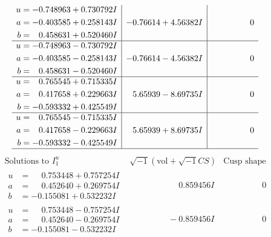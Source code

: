 \documentclass[1p]{elsarticle_modified}
\theoremstyle{definition}
\newcommand{\I}{\sqrt{-1}}
\begin{document}
$$\begin{array}{c|c|c}
\begin{aligned}
u &= -0.748963 + 0.730792 I \\
a &= -0.403585 + 0.258143 I \\
b &= \phantom{-}0.458631 + 0.520460 I\end{aligned}
 & -0.76614 + 4.56382 I & \phantom{-0.000000 } 0 \\ \hline\begin{aligned}
u &= -0.748963 - 0.730792 I \\
a &= -0.403585 - 0.258143 I \\
b &= \phantom{-}0.458631 - 0.520460 I\end{aligned}
 & -0.76614 - 4.56382 I & \phantom{-0.000000 } 0 \\ \hline\begin{aligned}
u &= \phantom{-}0.765545 + 0.715335 I \\
a &= \phantom{-}0.417658 + 0.229663 I \\
b &= -0.593332 + 0.425549 I\end{aligned}
 & \phantom{-}5.65939 - 8.69735 I & \phantom{-0.000000 } 0 \\ \hline\begin{aligned}
u &= \phantom{-}0.765545 - 0.715335 I \\
a &= \phantom{-}0.417658 - 0.229663 I \\
b &= -0.593332 - 0.425549 I\end{aligned}
 & \phantom{-}5.65939 + 8.69735 I & \phantom{-0.000000 } 0\\
 \hline 
 \end{array}$$\newpage$$\begin{array}{c|c|c}  
\text{Solutions to }I^u_{1}& \I (\text{vol} + \sqrt{-1}CS) & \text{Cusp shape}\\
 \hline 
\begin{aligned}
u &= \phantom{-}0.753448 + 0.757254 I \\
a &= \phantom{-}0.452640 + 0.269754 I \\
b &= -0.155081 + 0.532232 I\end{aligned}
 & \phantom{-0.000000 -}0.859456 I & \phantom{-0.000000 } 0 \\ \hline\begin{aligned}
u &= \phantom{-}0.753448 - 0.757254 I \\
a &= \phantom{-}0.452640 - 0.269754 I \\
b &= -0.155081 - 0.532232 I\end{aligned}
 & \phantom{-0.000000 } -0.859456 I & \phantom{-0.000000 } 0 \\ \hline\begin{aligned}

\end{aligned}
\end{array}$$
\end{document}
